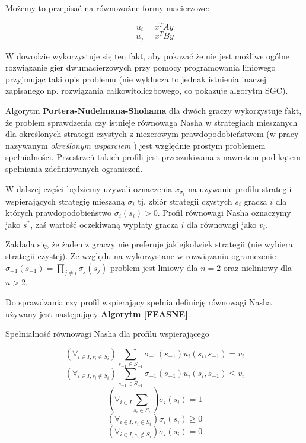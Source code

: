 \documentclass[polish]{standalone}
\begin{document}
Możemy to przepisać na równoważne formy macierzowe:

$$u_i = x^{T} A y$$
$$u_j = x^{T} B y$$

W dowodzie wykorzystuje się ten fakt, aby pokazać że nie jest możliwe ogólne rozwiązanie gier dwumacierzowych przy
pomocy programowania liniowego przyjmując taki opis problemu (nie wyklucza to jednak istnienia inaczej zapisanego np.
rozwiązania całkowitoliczbowego, co pokazuje algorytm SGC).

Algorytm \textbf{Portera-Nudelmana-Shohama} dla dwóch graczy wykorzystuje fakt, że problem sprawdzenia czy istnieje
równowaga Nasha w strategiach mieszanych dla określonych strategii czystych z niezerowym prawdopodobieństwem (w pracy
nazywanym \textit{określonym wsparciem} ) jest względnie prostym problemem spełnialności.
Przestrzeń takich profili jest przeszukiwana z nawrotem pod kątem spełniania zdefiniowanych ograniczeń.

W dalszej części będziemy używali oznaczenia $x_{\sigma_i}$ na używanie profilu strategii wspierających strategię
mieszaną $\sigma_i$ tj. zbiór strategii czystych $s_i$ gracza $i$ dla których prawdopodobieństwo $\sigma_i(s_i) > 0$.
Profil równowagi Nasha oznaczymy jako $s^{*}$, zaś wartość oczekiwaną wypłaty gracza $i$ dla równowagi jako $v_i$.

Zakłada się, że żaden z graczy nie preferuje jakiejkolwiek strategii (nie wybiera strategii czystej). Ze względu na
wykorzystane w rozwiązaniu ograniczenie $\sigma_{-1}(s_{-1}) = \prod_{j \ne i} \sigma_j(s_j)$ problem jest liniowy
dla $n = 2$ oraz nieliniowy dla $n > 2$.

Do sprawdzania czy profil wspierający spełnia definicję równowagi Nasha używany jest następujący \textbf{Algorytm
\ref{FEASNE}}.
\begin{algorithm}
\caption{Spełnialność równowagi Nasha dla profilu wspierającego}
\label{FEASNE}
\begin{algorithmic}
$$(\forall_{i \in I, s_i \in S_i}) \sum_{s_{-1} \in S_{-1}} \sigma_{-1}(s_{-1}) u_i(s_i, s_{-1}) = v_i$$
$$(\forall_{i \in I, s_i \not\in S_i}) \sum_{s_{-1} \in S_{-1}} \sigma_{-1}(s_{-1}) u_i(s_i, s_{-1}) \leq v_i$$
$$(\forall_{i \in I} \sum_{s_i \in S_i}) \sigma_i(s_i) = 1$$
$$(\forall_{i \in I, s_i \in S_i}) \sigma_i(s_i) \geq 0$$
$$(\forall_{i \in I, s_i \not\in S_i}) \sigma_i(s_i) = 0$$
\end{algorithmic}
\end{algorithm}
\end{document}
